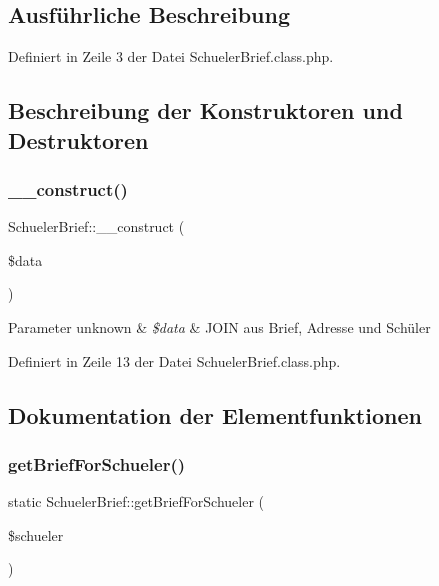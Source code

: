 \subsection{Ausführliche Beschreibung}


Definiert in Zeile 3 der Datei Schueler\+Brief.\+class.\+php.



\subsection{Beschreibung der Konstruktoren und Destruktoren}
\mbox{\label{class_schueler_brief_a93df58d28c115be9495fc53e5af66960}} 
\subsubsection{\texorpdfstring{\+\_\+\+\_\+construct()}{\_\_construct()}}
{\footnotesize\ttfamily Schueler\+Brief\+::\+\_\+\+\_\+construct (\begin{DoxyParamCaption}\item[{}]{\$data }\end{DoxyParamCaption})}


\begin{DoxyParams}[1]{Parameter}
unknown & {\em \$data} & J\+O\+IN aus Brief, Adresse und Schüler \\
\hline
\end{DoxyParams}


Definiert in Zeile 13 der Datei Schueler\+Brief.\+class.\+php.



\subsection{Dokumentation der Elementfunktionen}
\mbox{\label{class_schueler_brief_a125afeaeb4a83d3e47cea31d26d41b95}} 
\subsubsection{\texorpdfstring{get\+Brief\+For\+Schueler()}{getBriefForSchueler()}}
{\footnotesize\ttfamily static Schueler\+Brief\+::get\+Brief\+For\+Schueler (\begin{DoxyParamCaption}\item[{}]{\$schueler }\end{DoxyParamCaption})\hspace{0.3cm}{\ttfamily [static]}}


